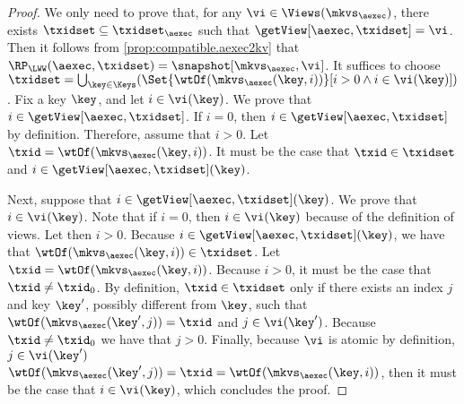 \begin{proof}
We only need to prove that, for any $\vi \in \Views(\mkvs_{\aexec})$, there exists $\txidset \subseteq \txidset_{\aexec}$ such 
that $\getView[\aexec, \txidset] = \vi$. Then it follows from \cref{prop:compatible.aexec2kv} that 
$\RP_{\LWW}(\aexec, \txidset) = \snapshot[\mkvs_{\aexec}, \vi]$. 
It suffices to choose $\txidset = \bigcup_{\key \in \Keys}(\Set{\wtOf(\mkvs_{\aexec}(\key, i))}[ i > 0 \land i \in \vi(\key)])$.
Fix a key $\key$, and let $i \in \vi(\key)$. We prove that $i \in \getView[\aexec, \txidset]$. 
If $i = 0$, then $i \in \getView[\aexec, \txidset]$ by definition. 
Therefore, assume that $i > 0$. Let $\txid = \wtOf(\mkvs_{\aexec}(\key, i))$.
It must be the case that $\txid \in \txidset$ and $i \in \getView[\aexec, \txidset](\key)$.

Next, suppose that $i \in \getView[\aexec, \txidset](\key)$. We prove that $i \in \vi(\key)$.
Note that if $i = 0$, then $i \in \vi(\key)$ because of the 
definition of views. Let then $i > 0$. Because $i \in \getView[\aexec, \txidset](\key)$, we have that 
$\wtOf(\mkvs_{\aexec}(\key, i)) \in \txidset$.  Let $\txid = \wtOf(\mkvs_{\aexec}(\key, i))$. Because $i > 0$, 
it must be the case that $\txid \neq \txid_0$.
By definition, $\txid \in \txidset$ only if there 
exists an index $j$ and key $\key'$, possibly different from $\key$, such that $\wtOf(\mkvs_{\aexec}(\key', j)) = \txid$ and $j \in \vi(\key')$. 
Because $\txid \neq \txid_0$ we have that $j > 0$. Finally, because $\vi$ is atomic by definition, $j \in \vi(\key')$
$\wtOf(\mkvs_{\aexec}(\key', j)) = \txid = \wtOf(\mkvs_{\aexec}(\key, i))$, then it must be the case 
that $i \in \vi(\key)$, which concludes the proof.
\end{proof}

